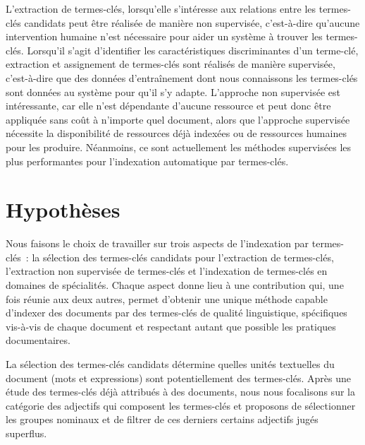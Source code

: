     L'extraction de termes-clés, lorsqu'elle s'intéresse aux relations entre les
    termes-clés candidats peut être réalisée de manière non supervisée,
    c'est-à-dire qu'aucune intervention humaine n'est nécessaire pour aider un
    système à trouver les termes-clés. Lorsqu'il s'agit d'identifier les
    caractéristiques discriminantes d'un terme-clé, extraction et assignement de
    termes-clés sont réalisés de manière supervisée, c'est-à-dire que des
    données d'entraînement dont nous connaissons les termes-clés sont données au
    système pour qu'il s'y adapte. L'approche non supervisée est intéressante,
    car elle n'est dépendante d'aucune ressource et peut donc être appliquée
    sans coût à n'importe quel document, alors que l'approche supervisée
    nécessite la disponibilité de ressources déjà indexées ou de ressources
    humaines pour les produire. Néanmoins, ce sont actuellement les méthodes
    supervisées les plus performantes pour l'indexation automatique par
    termes-clés.


  \section{Hypothèses}
  \label{sec:main-introduction-hypothesis}
    Nous faisons le choix de travailler sur trois aspects de l'indexation par
    termes-clés~: la sélection des termes-clés candidats pour l'extraction de
    termes-clés, l'extraction non supervisée de termes-clés et l'indexation de
    termes-clés en domaines de spécialités. Chaque aspect donne lieu à une
    contribution qui, une fois réunie aux deux autres, permet d'obtenir une
    unique méthode capable d'indexer des documents par des termes-clés de
    qualité linguistique, spécifiques vis-à-vis de chaque document et respectant
    autant que possible les pratiques documentaires.

    La sélection des termes-clés candidats détermine quelles unités textuelles
    du document (mots et expressions) sont potentiellement des termes-clés.
    Après une étude des termes-clés déjà attribués à des documents, nous nous
    focalisons sur la catégorie des adjectifs qui composent les termes-clés et
    proposons de sélectionner les groupes nominaux et de filtrer de ces derniers
    certains adjectifs jugés superflus.

